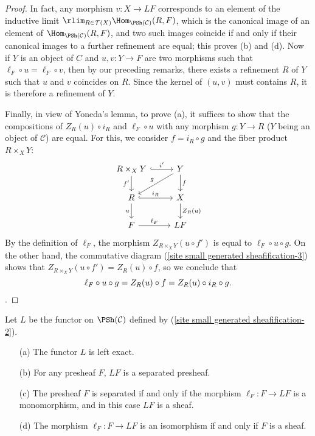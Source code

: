 \begin{proof}
In fact, any morphism $v:X\to LF$ corresponds to an element of the inductive limit $\rlim_{R\in\mathcal{T}(X)}\Hom_{\PSh(\mathcal{C})}(R,F)$, which is the canonical image of an element of $\Hom_{\PSh(\mathcal{C})}(R,F)$, and two such images coincide if and only if their canonical images to a further refinement are equal; this proves (b) and (d). Now if $Y$ is an object of $C$ and $u,v:Y\to F$ are two morphisms such that $\ell_F\circ u=\ell_F\circ v$, then by our preceding remarks, there exists a refinement $R$ of $Y$ such that $u$ and $v$ coincides on $R$. Since the kernel of $(u,v)$ must contains $R$, it is therefore a refinement of $Y$.\par
Finally, in view of Yoneda's lemma, to prove (a), it suffices to show that the compositions of $Z_R(u)\circ i_R$ and $\ell_F\circ u$ with any morphism $g:Y\to R$ ($Y$ being an object of $\mathcal{C}$) are equal. For this, we consider $f=i_R\circ g$ and the fiber product $R\times_XY$:
\[\begin{tikzcd}
R\times_XY\ar[r,hook,"i'"]\ar[d,swap,"f'"]&Y\ar[ld,swap,"g"]\ar[d,"f"]\\
R\ar[r,hook,"i_R"]\ar[d,swap,"u"]&X\ar[d,"Z_R(u)"]\\
F\ar[r,"\ell_F"]&LF
\end{tikzcd}\]
By the definition of $\ell_F$, the morphism $Z_{R\times_XY}(u\circ f')$ is equal to $\ell_F\circ u\circ g$. On the other hand, the commutative diagram (\ref{site small generated sheafification-3}) shows that $Z_{R\times_XY}(u\circ f')=Z_R(u)\circ f$, so we conclude that
\begin{equation*}
\ell_F\circ u\circ g=Z_R(u)\circ f=Z_R(u)\circ i_R\circ g.\qedhere
\end{equation*}.
\end{proof}
\begin{proposition}\label{site small generated sheafification functor prop}
Let $L$ be the functor on $\PSh(\mathcal{C})$ defined by (\ref{site small generated sheafification-2}).
\begin{enumerate}
\item[(a)] The functor $L$ is left exact.
\item[(b)] For any presheaf $F$, $LF$ is a separated presheaf.
\item[(c)] The presheaf $F$ is separated if and only if the morphism $\ell_F:F\to LF$ is a monomorphism, and in this case $LF$ is a sheaf.
\item[(d)] The morphism $\ell_F:F\to LF$ is an isomorphism if and only if $F$ is a sheaf. 
\end{enumerate} 
\end{proposition}
